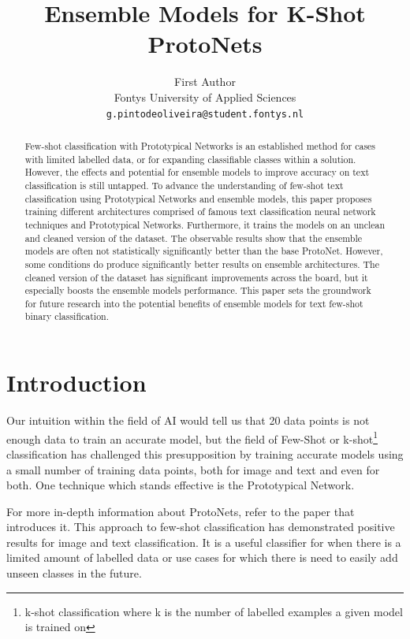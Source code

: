\documentclass[11pt]{article}
\title{Ensemble Models for K-Shot ProtoNets}
\author{First Author \\
  Fontys University of Applied Sciences \\
  \texttt{g.pintodeoliveira@student.fontys.nl}
}
\begin{document}
\maketitle
\begin{abstract}
  Few-shot classification with Prototypical Networks is an established method for cases with limited labelled data, or for expanding classifiable classes within a solution. However, the effects and potential for ensemble models to improve accuracy on text classification is still untapped.
  To advance the understanding of few-shot text classification using Prototypical Networks and ensemble models, this paper proposes training different architectures comprised of famous text classification neural network techniques and Prototypical Networks. Furthermore, it trains the models on an unclean and cleaned version of the dataset.
  The observable results show that the ensemble models are often not statistically significantly better than the base ProtoNet. However, some conditions do produce significantly better results on ensemble architectures.
  The cleaned version of the dataset has significant improvements across the board, but it especially boosts the ensemble models performance.
  This paper sets the groundwork for future research into the potential benefits of ensemble models for text few-shot binary classification. 
\end{abstract}

\section{Introduction}
  Our intuition within the field of AI would tell us that 20 data points is not enough data to train an accurate model, but the field of Few-Shot or k-shot\footnote{k-shot classification where k is the number of labelled examples a given model is trained on} classification has challenged this presupposition by training accurate models using a small number of training data points, both for image\cite{NIPS2017_cb8da676, hou2022closerlookprototypeclassifier, JI202081} and text\cite{sun-etal-2019-hierarchical, electronics11152423, Sourati2023-bq, Liu2025-gf} and even for both\cite{Pahde_2021_WACV}.
  One technique which stands effective is the Prototypical Network.

  For more in-depth information about ProtoNets, refer to the paper that introduces it\cite{NIPS2017_cb8da676}.
  This approach to few-shot classification has demonstrated positive results for image\cite{NIPS2017_cb8da676,hou2022closerlookprototypeclassifier, JI202081} and text classification\cite{sun-etal-2019-hierarchical,electronics11152423,Sourati2023-bq,Liu2025-gf}. It is a useful classifier for when there is a limited amount of labelled data or use cases for which there is need to easily add unseen classes in the future.
\end{document}
